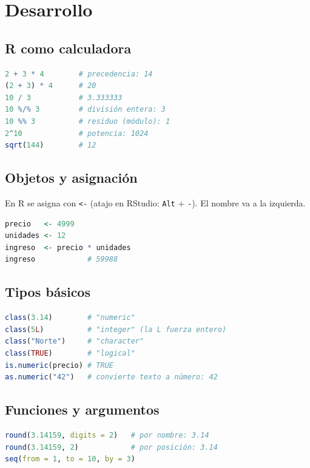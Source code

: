 \section{Desarrollo}

\subsection{R como calculadora}

\begin{lstlisting}[language=R]
2 + 3 * 4        # precedencia: 14
(2 + 3) * 4      # 20
10 / 3           # 3.333333
10 %/% 3         # división entera: 3
10 %% 3          # residuo (módulo): 1
2^10             # potencia: 1024
sqrt(144)        # 12
\end{lstlisting}

\subsection{Objetos y asignación}

En R se asigna con \passthrough{\lstinline!<-!} (atajo en RStudio:
\passthrough{\lstinline!Alt!} + \passthrough{\lstinline!-!}). El nombre
va a la izquierda.

\begin{lstlisting}[language=R]
precio   <- 4999
unidades <- 12
ingreso  <- precio * unidades
ingreso            # 59988
\end{lstlisting}

\subsection{Tipos básicos}

\begin{lstlisting}[language=R]
class(3.14)        # "numeric"
class(5L)          # "integer" (la L fuerza entero)
class("Norte")     # "character"
class(TRUE)        # "logical"
is.numeric(precio) # TRUE
as.numeric("42")   # convierte texto a número: 42
\end{lstlisting}

\subsection{Funciones y argumentos}

\begin{lstlisting}[language=R]
round(3.14159, digits = 2)   # por nombre: 3.14
round(3.14159, 2)            # por posición: 3.14
seq(from = 1, to = 10, by = 3)
\end{lstlisting}

